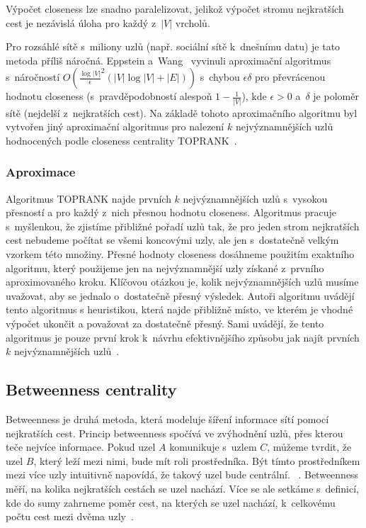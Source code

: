 \documentclass{bakalarka}
\begin{document}
Výpočet closeness lze snadno paralelizovat, jelikož výpočet stromu nejkratších
cest je nezávislá úloha pro každý z~$|V|$ vrcholů.

Pro rozsáhlé sítě s~miliony uzlů (např. sociální sítě k~dnešnímu datu) je tato
metoda příliš náročná. Eppstein a~Wang~\citep{closenessapproximation} vyvinuli
aproximační algoritmus s~náročností $O(\frac{\log|V|}{\epsilon}^2 (|V| \log |V|
+ |E|))$ s~chybou $\epsilon \delta$ pro převrácenou hodnotu closeness
(s~pravděpodobností alespoň $1 - \frac{1}{|V|}$), kde $\epsilon > 0$ a~$\delta$
je poloměr sítě (nejdelší z~nejkratších cest). Na základě tohoto aproximačního
algoritmu byl vytvořen jiný aproximační algoritmus pro nalezení $k$
nejvýznamnějších uzlů hodnocených podle closeness centrality
TOPRANK~\citep{closenessapproximation}.

\subsubsection{Aproximace}
Algoritmus TOPRANK najde prvních $k$ nejvýznamnějších uzlů s~vysokou přesností
a pro každý z~nich přesnou hodnotu closeness. Algoritmus pracuje s~myšlenkou,
že zjistíme přibližné pořadí uzlů tak, že pro jeden strom nejkratších cest
nebudeme počítat se všemi koncovými uzly, ale jen s~dostatečně velkým vzorkem
této množiny. Přesné hodnoty closeness dosáhneme použitím exaktního algoritmu,
který použijeme jen na nejvýznamnější uzly získané z~prvního aproximovaného
kroku. Klíčovou otázkou je, kolik nejvýznamnějších uzlů musíme uvažovat, aby se
jednalo o~dostatečně přesný výsledek. Autoři algoritmu uvádějí tento algoritmus
s heuristikou, která najde přibližně místo, ve kterém je vhodné výpočet ukončit
a považovat za dostatečně přesný. Sami uvádějí, že tento algoritmus je pouze
první krok k~návrhu efektivnějšího způsobu jak najít prvních $k$
nejvýznamnějších uzlů~\citep{closenessapproximation}.

\subsection{Betweenness centrality}
Betweenness je druhá metoda, která modeluje šíření informace sítí pomocí
nejkratších cest. Princip betweenness spočívá ve zvýhodnění uzlů, přes kterou
teče nejvíce informace. Pokud uzel $A$ komunikuje s~uzlem $C$, můžeme tvrdit,
že uzel $B$, který leží mezi nimi, bude mít roli prostředníka. Být tímto
prostředníkem mezi více uzly intuitivně napovídá, že takový uzel bude
centrální. ~\citep{hannemanriddle2005}. Betweenness měří, na kolika
nejkratších cestách se uzel nachází. Více se ale setkáme s~definicí, kde do
sumy zahrneme poměr cest, na kterých se uzel nachází, k~celkovému počtu cest
mezi dvěma uzly~\citep{freeman1977,anthonisse1971,brandes2001}.
\end{document}
